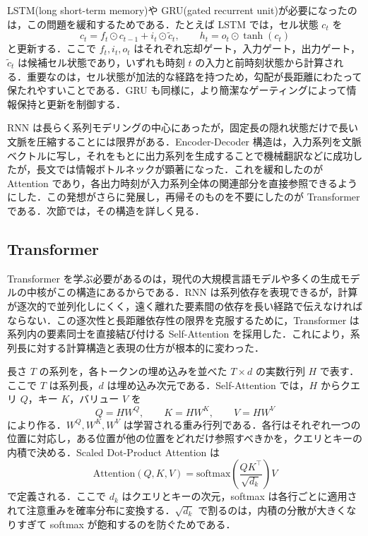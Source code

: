 LSTM(long short-term memory)\cite{Hochreiter1997}や GRU(gated recurrent unit)\cite{Cho2014}が必要になったのは，この問題を緩和するためである．たとえば LSTM では，セル状態 $c_t$ を
\begin{equation}
c_t = f_t\odot c_{t-1} + i_t\odot \tilde c_t,
\qquad
h_t = o_t\odot \tanh(c_t)
\end{equation}
と更新する．ここで $f_t,i_t,o_t$ はそれぞれ忘却ゲート，入力ゲート，出力ゲート，$\tilde c_t$ は候補セル状態であり，いずれも時刻 $t$ の入力と前時刻状態から計算される．重要なのは，セル状態が加法的な経路を持つため，勾配が長距離にわたって保たれやすいことである．GRU も同様に，より簡潔なゲーティングによって情報保持と更新を制御する．

RNN は長らく系列モデリングの中心にあったが，固定長の隠れ状態だけで長い文脈を圧縮することには限界がある．Encoder-Decoder 構造は，入力系列を文脈ベクトルに写し，それをもとに出力系列を生成することで機械翻訳などに成功したが，長文では情報ボトルネックが顕著になった．これを緩和したのが Attention\cite{Bahdanau2015} であり，各出力時刻が入力系列全体の関連部分を直接参照できるようにした．この発想がさらに発展し，再帰そのものを不要にしたのが Transformer\cite{Vaswani2017} である．次節では，その構造を詳しく見る．

\subsection{Transformer}
Transformer を学ぶ必要があるのは，現代の大規模言語モデルや多くの生成モデルの中核がこの構造にあるからである．RNN は系列依存を表現できるが，計算が逐次的で並列化しにくく，遠く離れた要素間の依存を長い経路で伝えなければならない．この逐次性と長距離依存性の限界を克服するために，Transformer は系列内の要素同士を直接結び付ける Self-Attention を採用した．これにより，系列長に対する計算構造と表現の仕方が根本的に変わった．

長さ $T$ の系列を，各トークンの埋め込みを並べた $T\times d$ の実数行列 $H$ で表す．ここで $T$ は系列長，$d$ は埋め込み次元である．Self-Attention では，$H$ からクエリ $Q$，キー $K$，バリュー $V$ を
\begin{equation}
Q=HW^Q,\qquad K=HW^K,\qquad V=HW^V
\end{equation}
により作る．$W^Q,W^K,W^V$ は学習される重み行列である．各行はそれぞれ一つの位置に対応し，ある位置が他の位置をどれだけ参照すべきかを，クエリとキーの内積で決める．Scaled Dot-Product Attention は
\begin{equation}
\mathrm{Attention}(Q,K,V)
= \mathrm{softmax}\left(\frac{QK^\top}{\sqrt{d_k}}\right)V
\end{equation}
で定義される．ここで $d_k$ はクエリとキーの次元，softmax は各行ごとに適用されて注意重みを確率分布に変換する．$\sqrt{d_k}$ で割るのは，内積の分散が大きくなりすぎて softmax が飽和するのを防ぐためである．

